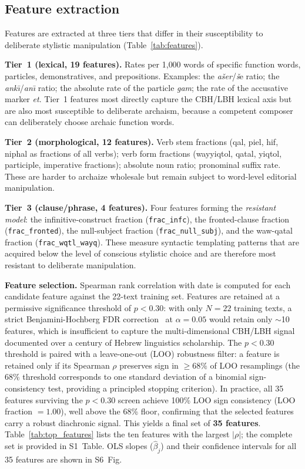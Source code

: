 \documentclass[10pt,letterpaper]{article}
\newcommand{\cbh}{CBH}
\newcommand{\lbh}{LBH}
\begin{document}
\subsection*{Feature extraction}

Features are extracted at three tiers that differ in their susceptibility
to deliberate stylistic manipulation (Table~\ref{tab:features}).

\textbf{Tier~1 (lexical, 19 features).}  Rates per 1{,}000 words of
specific function words, particles, demonstratives, and prepositions.
Examples: the \textit{ašer}/\textit{š}e ratio; the \textit{ank\={\i}}/\textit{an\={\i}}
ratio; the absolute rate of the particle \textit{gam}; the rate of the
accusative marker \textit{et}.  Tier~1 features most directly capture the
\cbh{}/\lbh{} lexical axis but are also most susceptible to deliberate
archaism, because a competent composer can deliberately choose archaic
function words.

\textbf{Tier~2 (morphological, 12 features).}  Verb stem fractions
(qal, piel, hif, niphal as fractions of all verbs); verb form fractions
(wayyiqtol, qatal, yiqtol, participle, imperative fractions); absolute noun
ratio; pronominal suffix rate.  These are harder to archaize wholesale but
remain subject to word-level editorial manipulation.

\textbf{Tier~3 (clause/phrase, 4 features).}  Four features forming the
\emph{resistant model}: the infinitive-construct fraction (\texttt{frac\_infc}),
the fronted-clause fraction (\texttt{frac\_fronted}), the null-subject
fraction (\texttt{frac\_null\_subj}), and the waw-qatal fraction
(\texttt{frac\_wqtl\_wayq}).  These measure syntactic templating patterns
that are acquired below the level of conscious stylistic choice and are
therefore most resistant to deliberate manipulation.

\textbf{Feature selection.}  Spearman rank correlation with date is
computed for each candidate feature against the 22-text training set.
Features are retained at a permissive significance threshold of $p < 0.30$:
with only $N = 22$ training texts, a strict Benjamini-Hochberg FDR
correction~\cite{Benjamini1995} at $\alpha = 0.05$ would retain only $\sim$10 features, which
is insufficient to capture the multi-dimensional CBH/LBH signal documented
over a century of Hebrew linguistics scholarship.  The $p < 0.30$ threshold
is paired with a leave-one-out (LOO) robustness filter: a feature is
retained only if its Spearman $\rho$ preserves sign in $\geq 68\%$ of LOO
resamplings (the 68\% threshold corresponds to one standard deviation of a
binomial sign-consistency test, providing a principled stopping criterion).
In practice, all 35 features surviving the $p < 0.30$ screen achieve
100\% LOO sign consistency (LOO fraction $= 1.00$), well above the 68\%
floor, confirming that the selected features carry a robust diachronic
signal.  This yields a final set of \textbf{35 features}.  Table~\ref{tab:top_features}
lists the ten features with the largest $|\rho|$; the complete set is
provided in S1~Table.  OLS slopes ($\hat{\beta}_j$) and their confidence
intervals for all 35 features are shown in S6~Fig.
\end{document}
